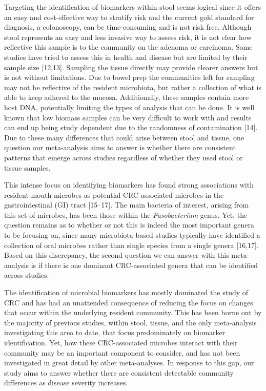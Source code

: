 \documentclass[12pt,]{article}
\begin{document}
Targeting the identification of biomarkers within stool seems logical
since it offers an easy and cost-effective way to stratify risk and the
current gold standard for diagnosis, a colonoscopy, can be
time-consuming and is not risk free. Although stool represents an easy
and less invasive way to assess risk, it is not clear how reflective
this sample is to the community on the adenoma or carcinoma. Some
studies have tried to assess this in health and disease but are limited
by their sample size {[}12,13{]}. Sampling the tissue directly may
provide clearer answers but is not without limitations. Due to bowel
prep the communities left for sampling may not be reflective of the
resident microbiota, but rather a collection of what is able to keep
adhered to the mucosa. Additionally, these samples contain more host
DNA, potentially limiting the types of analysis that can be done. It is
well known that low biomass samples can be very difficult to work with
and results can end up being study dependent due to the randomness of
contamination {[}14{]}. Due to these many differences that could arise
between stool and tissue, one question our meta-analysis aims to answer
is whether there are consistent patterns that emerge across studies
regardless of whether they used stool or tissue samples.

This intense focus on identifying biomarkers has found strong
associations with resident mouth microbes as potential CRC-associated
microbes in the gastrointestinal (GI) tract {[}15--17{]}. The main
bacteria of interest, arising from this set of microbes, has been those
within the \emph{Fusobacterium} genus. Yet, the question remains as to
whether or not this is indeed the most important genera to be focusing
on, since many microbiota-based studies typically have identified a
collection of oral microbes rather than single species from a single
genera {[}16,17{]}. Based on this discrepancy, the second question we
can answer with this meta-analysis is if there is one dominant
CRC-associated genera that can be identified across studies.

The identification of microbial biomarkers has mostly dominated the
study of CRC and has had an unattended consequence of reducing the focus
on changes that occur within the underlying resident community. This has
been borne out by the majority of previous studies, within stool,
tissue, and the only meta-analysis investigating this area to date, that
focus predominately on biomarker identification. Yet, how these
CRC-associated microbes interact with their community may be an
important component to consider, and has not been investigated in great
detail by other meta-analyses. In response to this gap, our study aims
to answer whether there are consistent detectable community differences
as disease severity increases.
\end{document}
